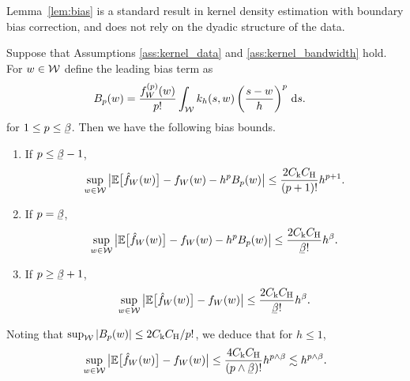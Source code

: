 
Lemma~\ref{lem:bias}
is a standard result in kernel density estimation
with boundary bias correction,
and does not rely on the dyadic structure of the data.

\begin{lemma}
  \label{lem:bias}

  Suppose that Assumptions \ref{ass:kernel_data} and
  \ref{ass:kernel_bandwidth} hold.
  For $w \in \mathcal{W}$
  define the leading bias term as
  \begin{align*}
    B_p(w)
    &=
    \frac{f_W^{(p)}(w)}{p!}
    \int_{\mathcal{W}}
    k_h(s,w)
    \left(
      \frac{s-w}{h}
    \right)^p
    \,\mathrm{d}s.
  \end{align*}
  for $1 \leq p \leq \flbeta$.
  Then we have the following bias bounds.
  \begin{enumerate}[label=(\roman*)]

    \item If $p \leq \flbeta - 1$,
      \begin{align*}
        \sup_{w \in \mathcal{W}}
        \big|
        \mathbb{E}\big[\hat f_W(w)\big]
        - f_W(w)
        - h^p B_p(w)
        \big|
        \leq
        \frac{2 C_{\mathrm{k}} C_{\mathrm{H}}}{(p+1)!}
        h^{p+1}.
      \end{align*}

    \item If $p = \flbeta$,
      \begin{align*}
        \sup_{w \in \cW}
        \big|
        \E\big[\hat f_W(w)\big]
        - f_W(w)
        - h^p B_p(w)
        \big|
        \leq
        \frac{2 C_\rk C_\rH}{\flbeta !}
        h^\beta.
      \end{align*}

    \item If $p \geq \flbeta+1$,
      \begin{align*}
        \sup_{w \in \cW}
        \big|
        \E\big[\hat f_W(w)\big]
        - f_W(w)
        \big|
        \leq
        \frac{2 C_\rk C_\rH}{\flbeta !}
        h^\beta.
      \end{align*}

  \end{enumerate}
  Noting that
  $\sup_{\mathcal{W}} |B_p(w)| \leq 2 C_{\mathrm{k}} C_{\mathrm{H}} / p!$,
  we deduce that for $h \leq 1$,
  \begin{align*}
    \sup_{w \in \cW}
    \big|
    \E\big[\hat f_W(w)\big]
    - f_W(w)
    \big|
    \leq
    \frac{4 C_\rk C_\rH}{(p \wedge \flbeta)!}
    h^{p \wedge \beta}
    \lesssim
    h^{p \wedge \beta}.
  \end{align*}

\end{lemma}


